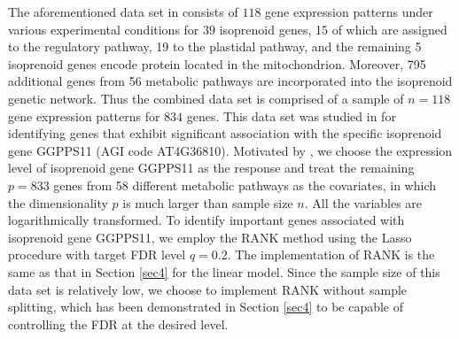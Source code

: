 \documentclass[11pt]{article}
\newcommand{\bOmg}{\mbox{\boldmath $\Omega$}}
\begin{document}
The aforementioned data set in \cite{Wille2004} consists of $118$ gene expression patterns under various experimental conditions for $39$ isoprenoid genes, 15 of which are assigned to the regulatory pathway, 19 to the plastidal pathway, and the remaining 5 isoprenoid genes encode protein located in the mitochondrion.  Moreover, 795 additional genes from 56 metabolic pathways are incorporated into the isoprenoid genetic network.  Thus the combined data set is comprised of a sample of $n = 118$ gene expression patterns for $834$ genes.  This data set was studied in  \cite{Yang2014} for identifying genes that exhibit significant association with the specific isoprenoid gene GGPPS11 (AGI code AT4G36810).
Motivated by   \cite{Yang2014}, we choose the expression level of isoprenoid gene GGPPS11 as the response and treat the remaining $p = 833$ genes from 58 different metabolic pathways as the covariates, in which the dimensionality $p$ is much larger than sample size $n$. All the variables are logarithmically transformed. To identify important genes associated with isoprenoid gene GGPPS11, we employ the RANK method using the Lasso procedure with target FDR level $q=0.2$. The implementation of RANK is the same as that  in Section \ref{sec4} for the linear model. Since the sample size of this data set is relatively low, we choose to implement RANK without sample splitting, which has been demonstrated in Section \ref{sec4} to be capable of controlling the FDR at the desired level.


\end{document}
